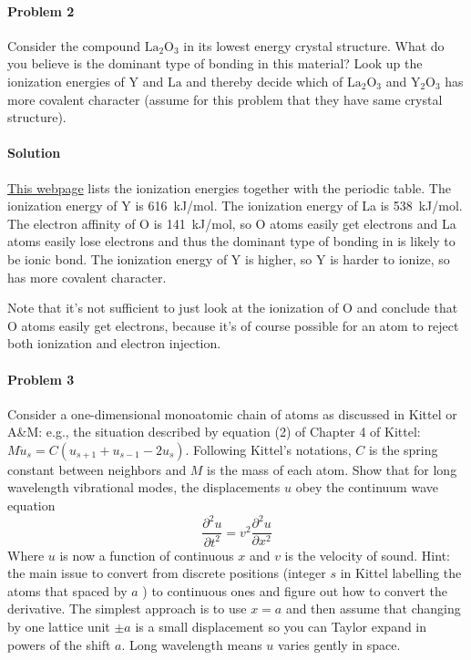 \documentclass[hyperref, a4paper]{article}
\begin{document}
\paragraph{Problem 2} Consider the compound $\mathrm{La}_2 \mathrm{O}_3$ in its lowest energy crystal structure. What do you believe is the dominant type of bonding in this material? Look up the ionization energies of $\mathrm{Y}$ and $\mathrm{La}$ and thereby decide which of $\mathrm{La}_2 \mathrm{O}_3$ and $\mathrm{Y}_2 \mathrm{O}_3$ has more covalent character (assume for this problem that they have same crystal structure).

\paragraph{Solution} 
\href{https://www.angelo.edu/faculty/kboudrea/periodic/trends\_ionization\_energy.htm}{This webpage}
lists the ionization energies together with the periodic table.
The ionization energy of Y is \SI{616}{kJ/mol}.
The ionization energy of La is \SI{538}{kJ/mol}.
The electron affinity of O is \SI{141}{kJ/mol}, 
so O atoms easily get electrons and La atoms easily lose electrons
and thus the dominant type of bonding in  is likely to be ionic bond.
The ionization energy of Y is higher,
so Y is harder to ionize,
so  has more covalent character.

Note that it's not sufficient to just look at the ionization of O
and conclude that O atoms easily get electrons,
because it's of course possible for an atom to reject both ionization and electron injection.

\paragraph{Problem 3} Consider a one-dimensional monoatomic chain of atoms as discussed in Kittel or A\&M: e.g., the situation described by equation (2) of Chapter 4 of Kittel: $M \ddot{u}_s=C\left(u_{s+1}+u_{s-1}-2 u_s\right)$. Following Kittel's notations, $C$ is the spring constant between neighbors and $M$ is the mass of each atom. Show that for long wavelength vibrational modes, the displacements $u$ obey the continuum wave equation
$$
\frac{\partial^2 u}{\partial t^2}=v^2 \frac{\partial^2 u}{\partial x^2}
$$
Where $u$ is now a function of continuous $x$ and $v$ is the velocity of sound. Hint: the main issue to convert from discrete positions (integer $s$ in Kittel labelling the atoms that spaced by $a$ ) to continuous ones and figure out how to convert the derivative. The simplest approach is to use $x=a$ and then assume that changing by one lattice unit $\pm a$ is a small displacement so you can Taylor expand in powers of the shift $a$. Long wavelength means $u$ varies gently in space.
\end{document}
